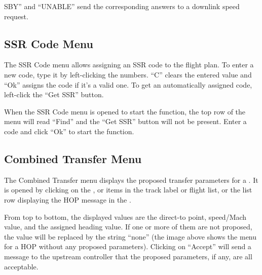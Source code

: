 \documentclass[a4paper,oneside,11pt]{memoir}
\begin{document}
SBY” and “UNABLE” send the corresponding answers to a downlink speed request.


\subsection{SSR Code Menu}\label{menu:assr}


The SSR Code menu allows assigning an SSR code to the flight plan. To enter a new code, type it by left-clicking the numbers. “C” clears the entered value and “Ok” assigns the code if it’s a valid one. To get an automatically assigned code, left-click the “Get SSR” button.

%
%

\bigskip

When the SSR Code menu is opened to start the  function, the top row of the menu will read “Find” and the “Get SSR” button will not be present. Enter a code and click “Ok” to start the function.

\subsection{Combined Transfer Menu}
\label{menu:ctm}

The Combined Transfer menu displays the proposed transfer parameters for a . It is opened by clicking on the ,  or  items in the track label or flight list, or the list row displaying the HOP message in the .

\bigskip

From top to bottom, the displayed values are the direct-to point, speed/Mach value, and the assigned heading value. If one or more of them are not proposed, the value will be replaced by the string “none” (the image above shows the menu for a HOP without any proposed parameters). Clicking on “Accept” will send a message to the upstream controller that the proposed parameters, if any, are all acceptable.
\end{document}
